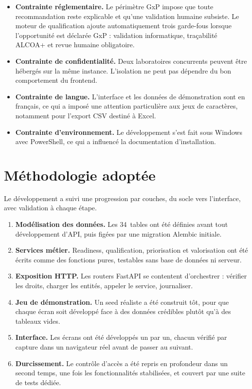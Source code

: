 \begin{itemize}
  \item \textbf{Contrainte réglementaire.} Le périmètre GxP impose que toute
    recommandation reste explicable et qu'une validation humaine subsiste. Le moteur de
    qualification ajoute automatiquement trois garde-fous lorsque l'opportunité est
    déclarée GxP : validation informatique, traçabilité ALCOA+ et revue humaine
    obligatoire.
  \item \textbf{Contrainte de confidentialité.} Deux laboratoires concurrents peuvent
    être hébergés sur la même instance. L'isolation ne peut pas dépendre du bon
    comportement du frontend.
  \item \textbf{Contrainte de langue.} L'interface et les données de démonstration sont
    en français, ce qui a imposé une attention particulière aux jeux de caractères,
    notamment pour l'export CSV destiné à Excel.
  \item \textbf{Contrainte d'environnement.} Le développement s'est fait sous Windows
    avec PowerShell, ce qui a influencé la documentation d'installation.
\end{itemize}

\section{Méthodologie adoptée}

Le développement a suivi une progression par couches, du socle vers l'interface, avec
validation à chaque étape.

\begin{enumerate}
  \item \textbf{Modélisation des données.} Les 34~tables ont été définies avant tout
    développement d'API, puis figées par une migration Alembic initiale.
  \item \textbf{Services métier.} Readiness, qualification, priorisation et
    valorisation ont été écrits comme des fonctions pures, testables sans base de
    données ni serveur.
  \item \textbf{Exposition HTTP.} Les routers FastAPI se contentent d'orchestrer :
    vérifier les droits, charger les entités, appeler le service, journaliser.
  \item \textbf{Jeu de démonstration.} Un seed réaliste a été construit tôt, pour que
    chaque écran soit développé face à des données crédibles plutôt qu'à des tableaux
    vides.
  \item \textbf{Interface.} Les écrans ont été développés un par un, chacun vérifié par
    capture dans un navigateur réel avant de passer au suivant.
  \item \textbf{Durcissement.} Le contrôle d'accès a été repris en profondeur dans un
    second temps, une fois les fonctionnalités stabilisées, et couvert par une suite de
    tests dédiée.
\end{enumerate}

